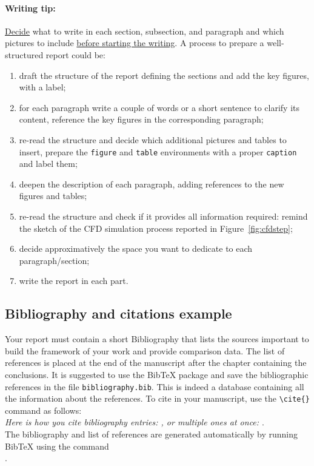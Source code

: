 \documentclass[11pt,a4paper]{article}
\begin{document}
\paragraph{Writing tip:} \underline{Decide} what to write in each section, subsection, and paragraph and which pictures to include \underline{before starting the writing}.
A process to prepare a well-structured report could be:
\begin{enumerate}
    \item draft the structure of the report defining the sections and add the key figures, with a label;
    \item for each paragraph write a couple of words or a short sentence to clarify its content, reference the key figures in the corresponding paragraph;
    \item re-read the structure and decide which additional pictures and tables to insert, prepare the \texttt{figure} and \texttt{table} environments with a proper \texttt{caption} and label them;
    \item deepen the description of each paragraph, adding references to the new figures and tables;
    \item re-read the structure and check if it provides all information required: remind the sketch of the CFD simulation process reported in Figure~\ref{fig:cfdstep};
    \item decide approximatively the space you want to dedicate to each paragraph/section;
    \item write the report in each part.
\end{enumerate}



\subsection{Bibliography and citations example}
Your report must contain a short Bibliography that lists the sources important to build the framework of your work and provide comparison data.
The list of references is placed at the end of the manuscript after the chapter containing the conclusions.
It is suggested to use the BibTeX package and save the bibliographic references in the file \verb|bibliography.bib|.
This is indeed a database containing all the information about the references. To cite in your manuscript, use the \verb|\cite{}| command as follows:
\\
\textit{Here is how you cite bibliography entries: \cite{AroMontes}, or multiple ones at once: \cite{AroMontes,TEXT01}}.
\\
The bibliography and list of references are generated automatically by running BibTeX \cite{bibtex} using the command \\ \verb||.
\end{document}
